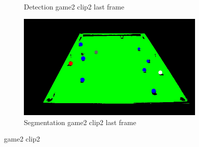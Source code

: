 \begin{figure}[H]
\begin{subfigure}[b]{0.35\textwidth}
        \caption{Detection game2 clip2 last frame}
        \label{fig: game2_clip2_last_frame_detected}
    \end{subfigure}
    \begin{subfigure}[b]{0.35\textwidth}
        \centering
        \includegraphics[width=\textwidth]{images/Segmentation/game2_clip2_segmented_balls_last_frame.jpg}
        \caption{Segmentation game2 clip2 last frame}
		\label{fig: game2_clip2_last_frame_segmented}
    \end{subfigure}
    
	\caption{game2 clip2}
\end{figure}

